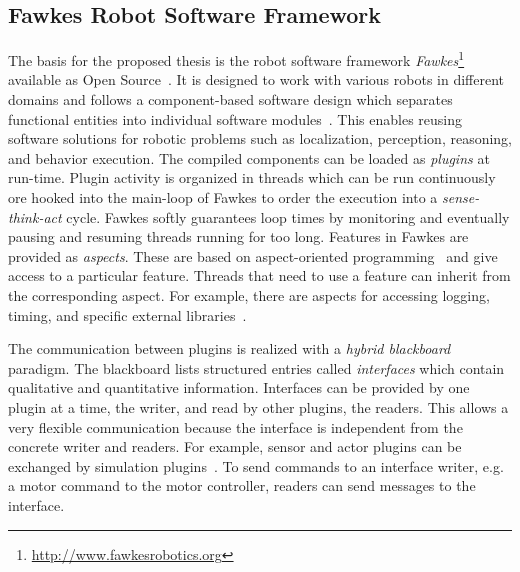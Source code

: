 \documentclass[a4paper,11pt]{article}
\begin{document}
\subsection{Fawkes Robot Software Framework}
\label{sec:fawkes}
The basis for the proposed thesis is the robot software framework
\emph{Fawkes}\footnote{\url{http://www.fawkesrobotics.org}}
available as Open Source~\cite{FawkesDesign,Fawkes-RCLL-2014}.
It is designed to work with
various robots in different domains and follows a component-based
software design which separates functional entities into individual
software modules~\cite{component}. This enables reusing
software solutions for robotic problems such as localization,
perception, reasoning, and behavior execution. The compiled
components can be loaded as \emph{plugins} at run-time.
%
Plugin activity is organized in threads
which can be run continuously ore hooked into
the main-loop of Fawkes to order the execution into a
\emph{sense-think-act} cycle.
Fawkes softly guarantees loop times by
monitoring and eventually pausing and resuming threads running for too
long.
Features in Fawkes are provided as \textit{aspects}. These are
based on aspect-oriented programming~\cite{aspect_oriented} and give
access to a particular feature. Threads that need to use a feature can
inherit from the corresponding aspect. For example, there are aspects
for accessing logging, timing, and specific external libraries~\cite{tnthesis}.

The communication between plugins is realized with a \emph{hybrid blackboard}
paradigm. The blackboard lists structured entries called
\emph{interfaces} which contain qualitative and quantitative information.
Interfaces can be
provided by one plugin at a time, the writer, and read by other
plugins, the readers. This allows a very flexible communication
because the interface is independent from the concrete writer and readers.
For example, sensor and actor plugins can be exchanged by simulation
plugins~\cite{LLSF-Sim}.
To send commands to an interface writer, e.g. a
motor command to the motor controller, readers can send messages to
the interface.
\end{document}
